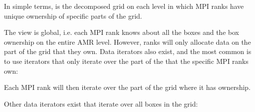 \documentclass[letterpaper,10pt,english]{sphinxmanual}
\begin{document}
\begin{sphinxVerbatim}[commandchars=\\\{\},formatcom=\scriptsize]
   
   

  
\end{sphinxVerbatim}

In simple terms,   is the decomposed grid on each level in which MPI ranks have unique ownership of specific parts of the grid.

The  view is global, i.e. each MPI rank knows about all the boxes and the box ownership on the entire AMR level.
However, ranks will only allocate data on the part of the grid that they own.
Data iterators also exist, and the most common is to use iterators that only iterate over the part of the  that the specific MPI ranks own:

\begin{sphinxVerbatim}[commandchars=\\\{\},formatcom=\scriptsize]
 
    
\end{sphinxVerbatim}

Each MPI rank will then iterate  over the part of the grid where it has ownership.

Other data iterators exist that iterate over all boxes in the grid:

\begin{sphinxVerbatim}[commandchars=\\\{\},formatcom=\scriptsize]
      
\end{sphinxVerbatim}
\end{document}
